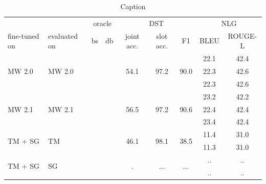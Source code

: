 \documentclass[11pt,a4paper]{article}
\newcommand{\cmark}{\ding{51}}%
\newcommand{\xmark}{\ding{55}}%
\begin{document}
\begin{table}
    \centering\small
    \begin{tabular}{ll|cc|ccc|cc}
        & & \multicolumn{2}{c|}{oracle} & \multicolumn{3}{c|}{DST} & \multicolumn{2}{c}{NLG} \\
        fine-tuned on & evaluated on & bs & db & joint acc. & slot acc. & F1 & BLEU & ROUGE-L \\
        \hline
        \multirow{3}{*}{MW 2.0} & \multirow{3}{*}{MW 2.0} & \xmark & \xmark & \multirow{3}{*}{54.1} & \multirow{3}{*}{97.2} & \multirow{3}{*}{90.0} & 22.1 & 42.4 \\
        && \xmark & \cmark &  & & & 22.3 & 42.6 \\
        && \cmark & \cmark &  & & & 22.3 & 42.6 \\
        \hline
        \multirow{3}{*}{MW 2.1} & \multirow{3}{*}{MW 2.1} & \xmark & \xmark & \multirow{3}{*}{56.5} & \multirow{3}{*}{97.2} & \multirow{3}{*}{90.6} & 23.2 & 42.2 \\
        && \xmark & \cmark &  & & & 22.4 & 42.4 \\
        && \cmark & \cmark &  & & & 23.4 & 42.4 \\
        \hline
        \multirow{2}{*}{TM + SG} & \multirow{2}{*}{TM} & \xmark & \cmark & \multirow{2}{*}{46.1} & \multirow{2}{*}{98.1} & \multirow{2}{*}{38.5} & 11.4 & 31.0 \\
        && \cmark & \cmark &  & & & 11.3 & 31.0 \\
        \hline
        \multirow{2}{*}{TM + SG} & \multirow{2}{*}{SG} & \xmark & \cmark & \multirow{2}{*}{.} & \multirow{2}{*}{...} & \multirow{2}{*}{...} & .. & .. \\
        && \cmark & \cmark &  & & & .. & .. \\
        \hline
    \end{tabular}
    \caption{Caption}
    \label{tab:my_label}
\end{table}
\end{document}
